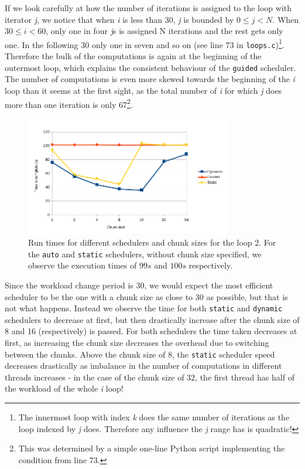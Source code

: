 \documentclass[11pt,a4paper]{article}
\begin{document}
If we look carefully at how the number of iterations is assigned to the loop with iterator \textit{j}, we notice that when \textit{i} is less than 30, \textit{j} is bounded by \(0 \leq j < N\). When \(30 \leq i < 60\), only one in four \textit{j}s is assigned N iterations and the rest gets only one. In the following 30 only one in seven and so on (see line 73 in \texttt{loops.c})\footnote{The innermost loop with index \textit{k} does the same number of iterations as the loop indexed by \textit{j} does. Therefore any influence the \textit{j} range has is quadratic!}. Therefore the bulk of the computations is again at the beginning of the outermost loop, which explains the consistent behaviour of the \texttt{guided} scheduler. The number of computations is even more skewed towards the beginning of the \textit{i} loop than it seems at the first sight, as the total number of \textit{i} for which \textit{j} does more than one iteration is only 67\footnote{This was determined by a simple one-line Python script implementing the condition from line 73.}.

\begin{figure}[h!]
    \begin{center}
        \includegraphics[width=0.8\textwidth]{loop2.png}
    \end{center}
    \caption{Run times for different schedulers and chunk sizes for the loop 2. For the \texttt{auto} and \texttt{static} schedulers, without chunk size specified, we observe the execution times of \(99s\) and \(100s\) respectively.}
\end{figure}

Since the workload change period is 30, we would expect the most efficient scheduler to be the one with a chunk size as close to 30 as possible, but that is not what happens. Instead we observe the time for both \texttt{static} and \texttt{dynamic} schedulers to decrease at first, but then drastically increase after the chunk size of 8 and 16 (respectively) is passed. For both schedulers the time taken decreases at first, as increasing the chunk size decreases the overhead due to switching between the chunks. Above the chunk size of 8, the \texttt{static} scheduler speed decreases drastically as imbalance in the number of computations in different threads increases - in the case of the chunk size of 32, the first thread has half of the workload of the whole \textit{i} loop!
\end{document}
